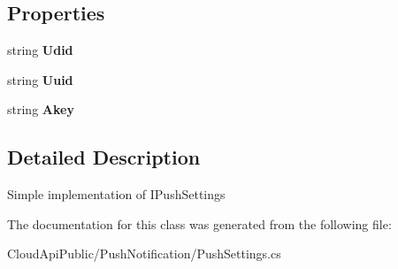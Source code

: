 \subsection*{Properties}
\begin{DoxyCompactItemize}
\item 
\hypertarget{class_cloud_api_public_1_1_push_notification_1_1_push_settings_abd2726070df1f88d325a22a00099147a}{string {\bfseries Udid}}\label{class_cloud_api_public_1_1_push_notification_1_1_push_settings_abd2726070df1f88d325a22a00099147a}

\item 
\hypertarget{class_cloud_api_public_1_1_push_notification_1_1_push_settings_a481a317fc0221ee9feb101df603f4ebf}{string {\bfseries Uuid}}\label{class_cloud_api_public_1_1_push_notification_1_1_push_settings_a481a317fc0221ee9feb101df603f4ebf}

\item 
\hypertarget{class_cloud_api_public_1_1_push_notification_1_1_push_settings_a563b955e45335bee999958e0ecbf2316}{string {\bfseries Akey}}\label{class_cloud_api_public_1_1_push_notification_1_1_push_settings_a563b955e45335bee999958e0ecbf2316}

\end{DoxyCompactItemize}


\subsection{Detailed Description}
Simple implementation of I\-Push\-Settings 



The documentation for this class was generated from the following file\-:\begin{DoxyCompactItemize}
\item 
Cloud\-Api\-Public/\-Push\-Notification/Push\-Settings.\-cs\end{DoxyCompactItemize}
